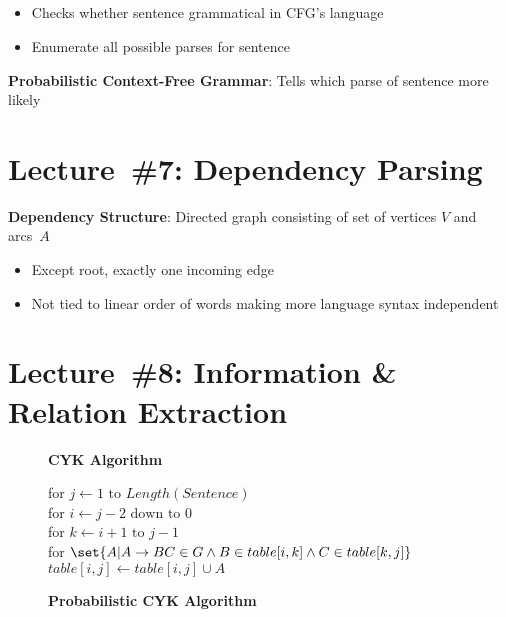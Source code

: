 \documentclass[9pt]{extarticle}
\renewcommand{\green}[1]{{\color{ForestGreen} #1}}
\newcommand{\greenbf}[1]{\textbf{\green{#1}}}
\begin{document}
\begin{multicols}{3}
  \subsection*{}

  \begin{itemize}
    \item Checks whether sentence grammatical in CFG's language
    \item Enumerate all possible parses for sentence
  \end{itemize}


  \greenbf{Probabilistic Context-Free Grammar}: Tells which parse of sentence more likely

  \section*{Lecture~\#7: Dependency Parsing}

  \greenbf{Dependency Structure}: Directed graph consisting of set of vertices $V$ and arcs~$A$
  \begin{itemize}
    \item Except root, exactly one incoming edge
    \item Not tied to linear order of words making more language syntax independent
  \end{itemize}

  \section*{Lecture~\#8: Information \& Relation Extraction}

\end{multicols}


\begin{figure}
  \centering
  \begin{minipage}{.47\textwidth}
    \begin{center}
      \textbf{CYK Algorithm}
    \end{center}
    for $j \gets 1 \text{ to } Length(Sentence)$ \\
    \hspace*{0.2cm}for $i \gets j-2 \text{ down to } 0$ \\
    \hspace*{0.4cm}for $k \gets i+1 \text{ to } j - 1$ \\
    \hspace*{0.6cm}for $\set{A \vert A \rightarrow BC \in G \wedge B \in table[i,k] \wedge C \in table[k,j]}$
    \hspace*{0.8cm}$table[i,j] \gets table[i,j] \cup A$
  \end{minipage}%
  \begin{minipage}{.47\textwidth}
    \begin{center}
      \textbf{Probabilistic CYK Algorithm}
    \end{center}
  \end{minipage}
\end{figure}
\end{document}
